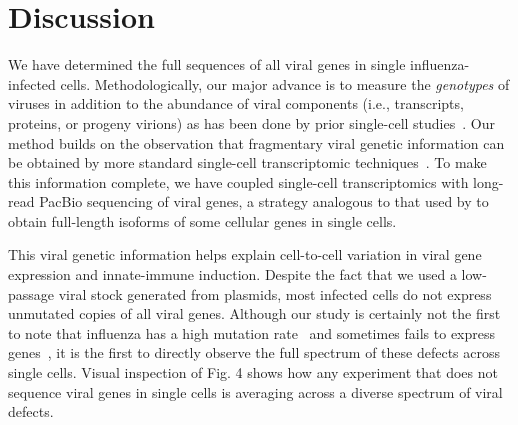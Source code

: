 \documentclass[]{article}
\begin{document}
\section*{Discussion}
We have determined the full sequences of all viral genes in single influenza-infected cells.
Methodologically, our major advance is to measure the \emph{genotypes} of viruses in addition to the abundance of viral components (i.e., transcripts, proteins, or progeny virions) as has been done by prior single-cell studies~\cite{russell2018extreme, steuerman2018dissection, heldt2015single, wang2018cell, sjaastad2018distinct, brooke2013most, zanini2018single, zanini2018virus, saikia2018simultaneous, oneal2018west, zhu2009growth, schulte2014single, akpinar2016high}.
Our method builds on the observation that fragmentary viral genetic information can be obtained by more standard single-cell transcriptomic techniques~\cite{wang2018cell, zanini2018virus, saikia2018simultaneous}.
To make this information complete, we have coupled single-cell transcriptomics with long-read PacBio sequencing of viral genes, a strategy analogous to that used by \cite{gupta2018single} to obtain full-length isoforms of some cellular genes in single cells.

This viral genetic information helps explain cell-to-cell variation in viral gene expression and innate-immune induction.
Despite the fact that we used a low-passage viral stock generated from plasmids, most infected cells do not express unmutated copies of all viral genes.
Although our study is certainly not the first to note that influenza has a high mutation rate~\cite{parvin1986measurement, suarez1992heterogeneity, suarez1994estimation, bloom2014experimentally, pauly2017novel} and sometimes fails to express genes~\cite{russell2018extreme, heldt2015single, brooke2013most, dou2017analysis, jacobs2019incomplete}, it is the first to directly observe the full spectrum of these defects across single cells.
Visual inspection of Fig. 4 shows how any experiment that does not sequence viral genes in single cells is averaging across a diverse spectrum of viral defects.
\end{document}
